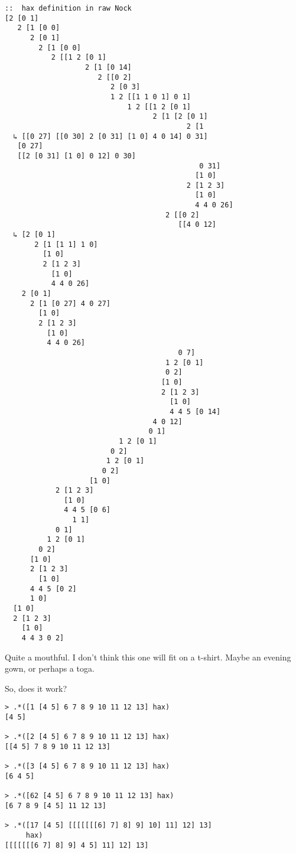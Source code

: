 \documentclass[twoside]{article}
\begin{document}
\newpage
\begin{lstlisting}[style=listingcode]
::  hax definition in raw Nock
[2 [0 1]
   2 [1 [0 0]
      2 [0 1]
        2 [1 [0 0]
           2 [[1 2 [0 1]
                   2 [1 [0 14]
                      2 [[0 2]
                         2 [0 3]
                         1 2 [[1 1 0 1] 0 1]
                             1 2 [[1 2 [0 1]
                                   2 [1 [2 [0 1]
                                           2 [1
  ↳ [[0 27] [[0 30] 2 [0 31] [1 0] 4 0 14] 0 31]
   [0 27]
   [[2 [0 31] [1 0] 0 12] 0 30]
                                              0 31]
                                             [1 0]
                                           2 [1 2 3]
                                             [1 0]
                                             4 4 0 26]
                                      2 [[0 2]
                                         [[4 0 12]
  ↳ [2 [0 1]
       2 [1 [1 1] 1 0]
         [1 0]
         2 [1 2 3]
           [1 0]
           4 4 0 26]
    2 [0 1]
      2 [1 [0 27] 4 0 27]
        [1 0]
        2 [1 2 3]
          [1 0]
          4 4 0 26]
                                         0 7]
                                      1 2 [0 1]
                                      0 2]
                                     [1 0]
                                     2 [1 2 3]
                                       [1 0]
                                       4 4 5 [0 14]
                                   4 0 12]
                                  0 1]
                           1 2 [0 1]
                         0 2]
                        1 2 [0 1]
                       0 2]
                    [1 0]
            2 [1 2 3]
              [1 0]
              4 4 5 [0 6]
                1 1]
            0 1]
          1 2 [0 1]
        0 2]
      [1 0]
      2 [1 2 3]
        [1 0]
      4 4 5 [0 2]
      1 0]
  [1 0]
  2 [1 2 3]
    [1 0]
    4 4 3 0 2]
\end{lstlisting}

\noindent
Quite a mouthful. I don't think this one will fit on a t-shirt. 
Maybe an evening gown, or perhaps a toga.

So, does it work?

\begin{lstlisting}[style=listingcode]
> .*([1 [4 5] 6 7 8 9 10 11 12 13] hax)
[4 5]

> .*([2 [4 5] 6 7 8 9 10 11 12 13] hax)
[[4 5] 7 8 9 10 11 12 13]

> .*([3 [4 5] 6 7 8 9 10 11 12 13] hax)
[6 4 5]

> .*([62 [4 5] 6 7 8 9 10 11 12 13] hax)
[6 7 8 9 [4 5] 11 12 13]

> .*([17 [4 5] [[[[[[[6] 7] 8] 9] 10] 11] 12] 13]
     hax)
[[[[[[[6 7] 8] 9] 4 5] 11] 12] 13]
\end{lstlisting}
\end{document}
